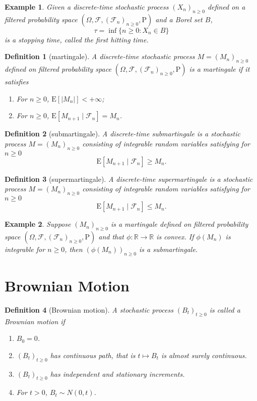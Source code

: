 \documentclass{article}
\newtheorem{definition}{Definition}[section]
\newtheorem{example}{Example}[section]
\theoremstyle{nonumberplain}
\begin{document}
\begin{example}
	Given a discrete-time stochastic process $(X_{n})_{n\ge 0}$ defined on a filtered probability space $(\Omega,\mathcal{F},(\mathcal{F}_{n})_{n\ge0 },\mathrm{P})$ and a Borel set $B$,
	\[
	\tau=\inf\{n\ge0:X_n\in B\}
	\]
	is a stopping time, called the first hitting time.
\end{example}

\begin{definition}[martingale]
	A discrete-time stochastic process $M=(M_n)_{n\ge 0}$ defined on filtered probability space $(\Omega,\mathcal{F},(\mathcal{F}_{n})_{n\ge0},\mathrm{P})$ is a \emph{martingale} if it satisfies
	\begin{enumerate}
		\item For $n\ge0$, $\mathrm{E}[|M_n|]<+\infty$;
		\item For $n\ge0$, $\mathrm{E}[M_{n+1}\mid\mathcal{F}_n]=M_n$.
	\end{enumerate}
\end{definition}
\begin{definition}[submartingale]
A discrete-time \emph{submartingale} is a stochastic process $M=(M_n)_{n\ge 0}$ consisting of integrable random variables satisfying for $n\ge0$
\[
\mathrm{E}[M_{n+1}\mid\mathcal{F}_n]\ge M_n.
\]
\end{definition}
\begin{definition}[supermartingale]
	A discrete-time \emph{supermartingale} is a stochastic process $M=(M_n)_{n\ge 0}$ consisting of integrable random variables satisfying for $n\ge0$
	\[
	\mathrm{E}[M_{n+1}\mid\mathcal{F}_n]\le M_n.
	\]
\end{definition}

\begin{example}
	Suppose $(M_n)_{n\ge 0}$ is a martingale defined on filtered probability space $(\Omega,\mathcal{F},(\mathcal{F}_{n})_{n\ge0},\mathrm{P})$ and that $\phi:\mathbb{R}\to\mathbb{R}$ is convex. If $\phi(M_n)$ is integrable for $n\ge0$, then $\left(\phi(M_n)\right)_{n\ge 0}$ is a submartingale.
\end{example}


\section{Brownian Motion}
\begin{definition}[Brownian motion]
	A stochastic process $(B_t)_{t\ge0}$ is called a \emph{Brownian motion} if
	\begin{enumerate}
		\item $B_0=0$.
		\item $(B_t)_{t\ge0}$ has continuous path, that is $t\mapsto B_t$ is almost surely continuous.
		\item $(B_t)_{t\ge0}$ has independent and stationary increments.
		\item For $t>0$, $B_t\sim N(0,t)$.
	\end{enumerate}
\end{definition}
\end{document}
